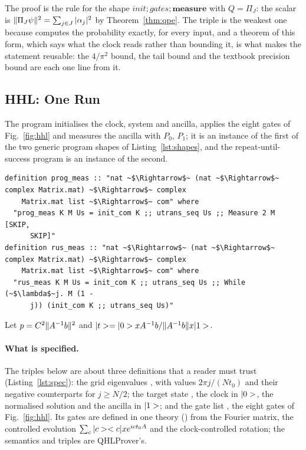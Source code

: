 The proof is the rule for the shape $\mathit{init};\mathit{gates};\mathbf{measure}$ with
$Q=\Pi_J$: the scalar is $\|\Pi_J\psi\|^2=\sum_{j\in J}|\alpha_j|^2$ by Theorem~\ref{thm:qpe}. The
triple is the weakest one because  computes the probability exactly, for every input,
and a theorem of this form, which says what the clock reads rather than bounding it, is what makes the
statement reusable: the $4/\pi^2$ bound, the tail bound and the textbook precision bound are each one
line from it.

\subsection{HHL: One Run}

The program  initialises the clock, system and ancilla, applies the eight gates of
Fig.~\ref{fig:hhl} and measures the ancilla with $P_0$, $P_1$; it is an instance of the first of the two
generic program shapes of Listing~\ref{lst:shapes}, and the repeat-until-success program is an instance of
the second.

\begin{lstlisting}[float=tp,caption={The two program shapes: one run, and repeat until outcome~$1$ (the loop's measurement is swapped so that it exits on~$1$); HHL instantiates them with the eight gates and the ancilla projectors},label={lst:shapes}]
definition prog_meas :: "nat ~$\Rightarrow$~ (nat ~$\Rightarrow$~ complex Matrix.mat) ~$\Rightarrow$~ complex
    Matrix.mat list ~$\Rightarrow$~ com" where
  "prog_meas K M Us = init_com K ;; utrans_seq Us ;; Measure 2 M [SKIP,
      SKIP]"
definition rus_meas :: "nat ~$\Rightarrow$~ (nat ~$\Rightarrow$~ complex Matrix.mat) ~$\Rightarrow$~ complex
    Matrix.mat list ~$\Rightarrow$~ com" where
  "rus_meas K M Us = init_com K ;; utrans_seq Us ;; While (~$\lambda$~j. M (1 -
      j)) (init_com K ;; utrans_seq Us)"
\end{lstlisting}
 Let $p=C^2\|A^{-1}b\|^2$ and
$|t>=|0>x A^{-1}b/\|A^{-1}b\|x|1>$.

\paragraph{What is specified.} The triples below are about three definitions that a reader must trust
(Listing~\ref{lst:spec}): the grid eigenvalues , with values $2\pi j/(Nt_0)$ and their
negative counterparts for $j\ge N/2$; the target state , the clock in $|0>$, the
normalised solution and the ancilla in $|1>$; and the gate list , the eight gates of
Fig.~\ref{fig:hhl}. Its gates are defined in one theory () from the Fourier matrix,
the controlled evolution $\sum_c|c>< c|x e^{ict_0A}$ and the clock-controlled rotation; the
semantics and triples are QHLProver's.

